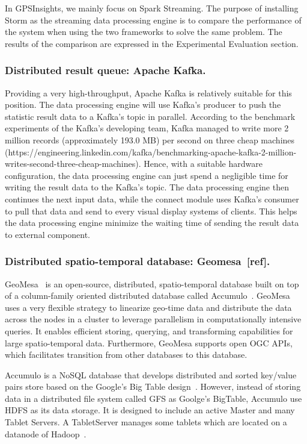 \documentclass{acm_proc_article-sp}
\begin{document}
In GPSInsights, we mainly focus on Spark Streaming. The purpose of installing Storm as the streaming data processing engine is to compare the performance of the system when using the two frameworks to solve the same problem. The results of the comparison are expressed in the Experimental Evaluation section.

\subsubsection{Distributed result queue: Apache Kafka.} Providing a very high-throughput, Apache Kafka is relatively suitable for this position. The data processing engine will use Kafka's producer to push the statistic result data to a Kafka's topic in parallel. According to the benchmark experiments of the Kafka's developing team,  Kafka managed to write more 2 million records (approximately 193.0 MB)  per second on three cheap machines (https://engineering.linkedin.com/kafka/benchmarking-apache-kafka-2-million-writes-second-three-cheap-machines). Hence, with a suitable hardware configuration, the data processing engine can just spend a negligible time for writing the result data to the Kafka's topic. The data processing engine then continues the next input data, while the connect module uses Kafka's consumer to pull that data and send to every visual display systems of clients. This helps the data processing engine minimize the waiting time of sending the result data to external component.

\subsubsection{Distributed spatio-temporal database: Geomesa~[ref].}
 GeoMesa~\cite{fox2013spatio} is an open-source, distributed, spatio-temporal database  built on top of a column-family oriented distributed database called Accumulo~\cite{accumuloonline}. GeoMesa uses a very flexible strategy to linearize geo-time data and distribute the data across the nodes in a cluster to leverage parallelism in computationally intensive queries. It enables efficient storing, querying, and transforming capabilities for large spatio-temporal data. Furthermore, GeoMesa supports open OGC APIs, which facilitates transition from other databases to this database.

\setlength{\parindent}{0.7cm} Accumulo is a NoSQL database that develops distributed and sorted key/value pairs store based on the Google's Big Table design~\cite{Chang2008BigTable}. However, instead of storing data in a distributed file system called GFS as Goolge's BigTable, Accumulo use HDFS as its data storage. It is designed to include an active Master and many Tablet Servers. A TabletServer manages some tablets which are located on a datanode of Hadoop~\cite{shvachko2010hadoop,Sivaraman2014hadoop}. 
\end{document}
